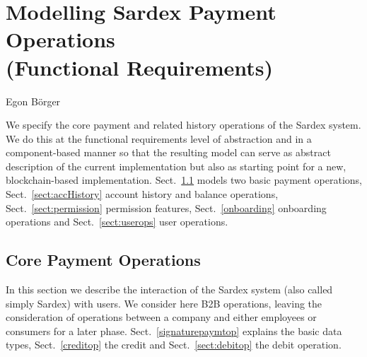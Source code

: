 \chapter{Modelling Sardex Payment Operations\\ (Functional Requirements)}
\label{ch:funreq}


\vspace{-1cm}
\begin{center}
Egon B\"orger
\end{center}


We specify the core payment and related history operations of the Sardex system. We do this at the functional requirements  level of abstraction and in a component-based manner so that the resulting model can serve as abstract description of the current implementation but also as starting point for a new, blockchain-based implementation. Sect.~\ref{sect:paymtops} models  two basic payment operations, Sect.~\ref{sect:accHistory} account history and balance operations, Sect.~\ref{sect:permission} permission features, Sect.~\ref{onboarding} onboarding operations and Sect.~\ref{sect:userops} user operations.


\section{Core Payment Operations}
\label{sect:paymtops}

In this section we describe the interaction of the Sardex system (also called simply Sardex)  with users. We consider here B2B operations, leaving the consideration of operations between a company and either employees or consumers for a later phase. Sect.~\ref{signaturepaymtop} explains the basic data types,  Sect.~\ref{creditop} the credit and  Sect.~\ref{sect:debitop} the debit operation.

